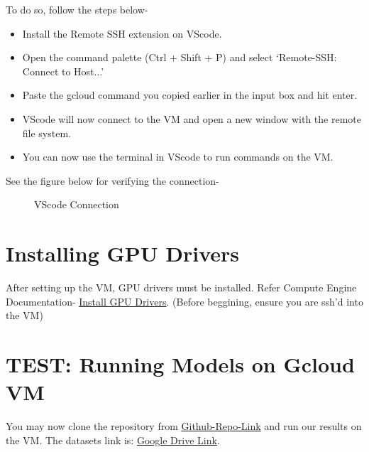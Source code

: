 \documentclass[12pt]{article}
\begin{document}
To do so, follow the steps below-
\begin{itemize}
    \item
    Install the Remote SSH extension on VScode.
    
    \item
    Open the command palette (Ctrl + Shift + P) and select `Remote-SSH: Connect to Host...'
    
    \item
    Paste the gcloud command you copied earlier in the input box and hit enter.
    
    \item
    VScode will now connect to the VM and open a new window with the remote file system.

    \item
    You can now use the terminal in VScode to run commands on the VM.
\end{itemize}

See the figure below for verifying the connection-
\begin{figure}[h]
    \centering
        \caption{VScode Connection}
\end{figure}

\section{Installing GPU Drivers}
\label{sec:hello}
After setting up the VM, GPU drivers must be installed. Refer Compute Engine Documentation- \href{https://cloud.google.com/compute/docs/gpus/install-drivers-gpu}{\color{blue}Install GPU Drivers}. (Before beggining, ensure you are ssh'd into the VM)

\section{TEST: Running Models on Gcloud VM}
You may now clone the repository from \href{Github}{Github-Repo-Link} and run our results on the VM. The datasets link is: \href{no-link}{\color{blue}Google Drive Link}.\\
\end{document}
